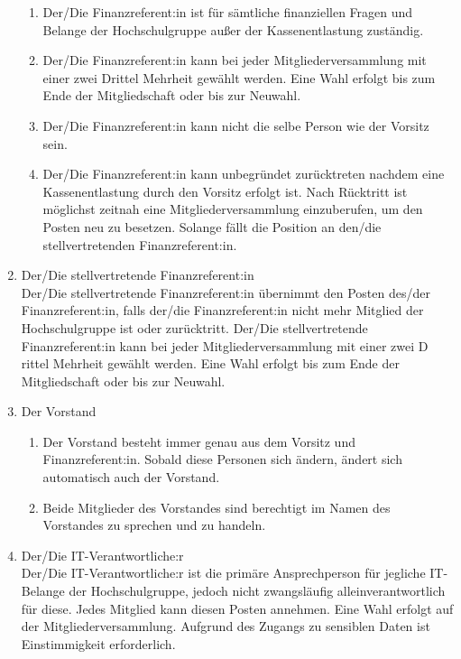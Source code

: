 \documentclass[11pt]{article}
\begin{document}
\begin{enumerate}
\begin{enumerate}
		      \item Der/Die Finanzreferent:in ist für sämtliche finanziellen Fragen und Belange der Hochschulgruppe außer der Kassenentlastung zuständig.
		      \item Der/Die Finanzreferent:in kann bei jeder Mitgliederversammlung mit einer zwei Drittel Mehrheit gewählt werden. Eine Wahl erfolgt bis zum Ende der Mitgliedschaft oder bis zur Neuwahl.
		      \item Der/Die Finanzreferent:in kann nicht die selbe Person wie der Vorsitz sein.
		      \item Der/Die Finanzreferent:in kann unbegründet zurücktreten nachdem eine Kassenentlastung durch den Vorsitz erfolgt ist. Nach Rücktritt ist möglichst zeitnah eine Mitgliederversammlung einzuberufen,  um den Posten neu zu besetzen. Solange fällt die Position an den/die stellvertretenden Finanzreferent:in.
	      \end{enumerate}
	\item Der/Die stellvertretende Finanzreferent:in\\
	      Der/Die stellvertretende Finanzreferent:in übernimmt den Posten des/der Finanzreferent:in, falls der/die Finanzreferent:in nicht mehr Mitglied der Hochschulgruppe ist oder zurücktritt. Der/Die stellvertretende Finanzreferent:in kann bei jeder Mitgliederversammlung mit einer zwei D
	      rittel Mehrheit gewählt werden. Eine Wahl erfolgt bis zum Ende der Mitgliedschaft oder bis zur Neuwahl.
	\item Der Vorstand
	      \begin{enumerate}
		      \item Der Vorstand besteht immer genau aus dem Vorsitz und Finanzreferent:in. Sobald diese Personen sich ändern, ändert sich automatisch auch der Vorstand.
		      \item Beide Mitglieder des Vorstandes sind berechtigt im Namen des Vorstandes zu sprechen und zu handeln.
	      \end{enumerate}
	\item Der/Die IT-Verantwortliche:r\\
	      Der/Die IT-Verantwortliche:r ist die primäre Ansprechperson für jegliche IT-Belange der Hochschulgruppe, jedoch nicht zwangsläufig alleinverantwortlich für diese. Jedes Mitglied kann diesen Posten annehmen. Eine Wahl erfolgt auf der Mitgliederversammlung. Aufgrund des Zugangs zu sensiblen Daten ist Einstimmigkeit erforderlich.
\end{enumerate}
\end{document}
